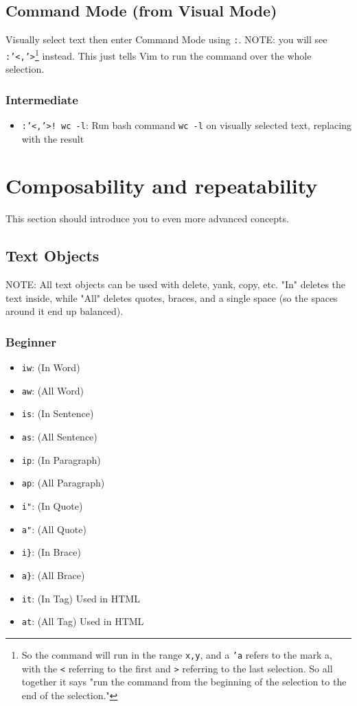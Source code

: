 \documentclass[11pt]{article}
\begin{document}
\subsection{Command Mode (from Visual Mode)}
\label{sec:orga66b99c}
Visually select text then enter Command Mode using \texttt{:}. NOTE: you will see
\texttt{:'<,'>}\footnote{So the command will run in the range \texttt{x,y}, and a \texttt{'a} refers to
the mark a, with the \texttt{<} referring to the first and \texttt{>} referring to the
last selection. So all together it says "run the command from the 
beginning of the selection to the end of the selection."} instead. This just tells Vim to run the command over the whole
selection.
\subsubsection{Intermediate}
\label{sec:org61b1063}
\begin{itemize}
\item \texttt{:'<,'>! wc -l}: Run bash command \texttt{wc -l} on visually selected text, replacing with the result
\end{itemize}
\section{Composability and repeatability}
\label{sec:org8ebefeb}
This section should introduce you to even more advanced concepts.
\subsection{Text Objects}
\label{sec:org85eba9b}
NOTE: All text objects can be used with delete, yank, copy, etc. "In" deletes
the text inside, while "All" deletes quotes, braces, and a single space (so the
spaces around it end up balanced).
\subsubsection{Beginner}
\label{sec:org7525b84}
\begin{itemize}
\item \texttt{iw}: (In Word)
\item \texttt{aw}: (All Word)
\item \texttt{is}: (In Sentence)
\item \texttt{as}: (All Sentence)
\item \texttt{ip}: (In Paragraph)
\item \texttt{ap}: (All Paragraph)
\item \texttt{i"}: (In Quote)
\item \texttt{a"}: (All Quote)
\item \texttt{i\}}: (In Brace)
\item \texttt{a\}}: (All Brace)
\item \texttt{it}: (In Tag) Used in HTML
\item \texttt{at}: (All Tag) Used in HTML
\end{itemize}
\end{document}
